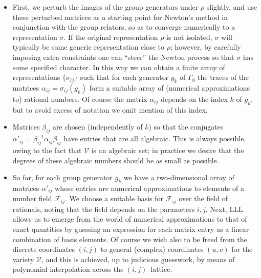 \begin{itemize}
\item[\bf (i)]  First, we perturb the images of the group generators under $\rho$
slightly, and use these perturbed matrices as a starting point for Newton's method
in conjunction with the group relators, so as to converge numerically to a
representation $\sigma$.  If the original representation $\rho$ is not isolated,
$\sigma$ will typically be some generic representation close to $\rho$; however,
by carefully imposing extra constraints one can ``steer'' the Newton process so
that $\sigma$ has some specified character.  In this way we can obtain a
finite array of representations $\{\sigma_{ij}\}$ such that for each generator $g_k$ of $\Gamma_8$
the traces of the matrices $\alpha_{ij} = \sigma_{ij}(g_k) $ form a suitable array of (numerical
approximations to) rational numbers.  Of course the matrix $\alpha_{ij}$ depends on the
index $k$ of $g_k$, but to avoid excess of notation we omit mention of this index.
\item[\bf (ii)]  Matrices $\beta_{ij}$ are chosen (independently of $k$) so that the conjugates
$\alpha'_{ij} = \beta^{-1}_{ij} \alpha_{ij} \beta_{ij}$ have entries that are all algebraic.
This is always possible, owing to the fact that $\mathcal{V}$ is an algebraic
set; in practice we desire that the degrees of these algebraic numbers should be
as small as possible.
\item[\bf (iii)]  So far, for each group generator $g_k$ we have a two-dimensional array
of matrices $\alpha'_{ij}$ whose entries
are numerical approximations to elements of a number field $\mathcal{F}_{ij}$.
We choose a suitable basis for $\mathcal{F}_{ij}$ over the field of rationals,
noting that the field depends on the parameters $i, j$.  Next, LLL allows us to emerge
from the world of numerical approximations to that of exact quantities by guessing
an expression for each matrix entry as a linear combination of basis elements.
Of course we wish also to be freed from the discrete coordinates $(i, j)$ to
general (complex) coordinates $(u, v)$ for the variety $\mathcal V$, and this is
achieved, up to judicious guesswork, by means of polynomial interpolation across
the $(i,j)$--lattice.


\end{itemize}
